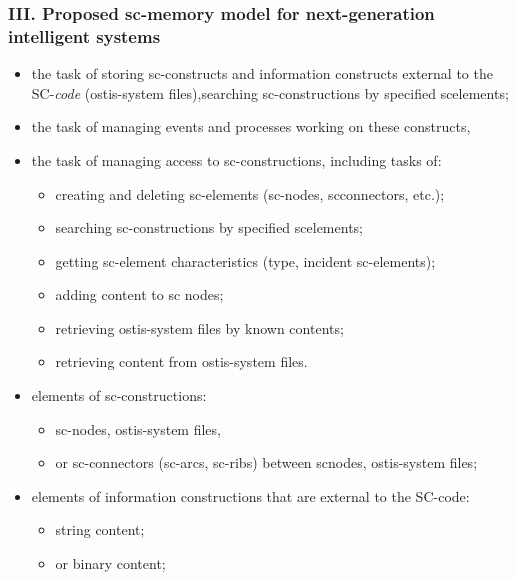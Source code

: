 \documentclass{article}
\begin{document}
\begin{multicols}{2}
\begin{center}
  \subsubsection*{\textmd{\normalsize{III. Proposed sc-memory model for next-generation
intelligent systems}}}
\end{center}

\begin{itemize}
\item the task of storing sc-constructs and information
constructs external to the SC-\textit{code} (ostis-system
files),searching sc-constructions by specified scelements;
\item the task of managing events and processes working
on these constructs,
\item the task of managing access to sc-constructions,
including tasks of:
\begin{itemize}
\item creating and deleting sc-elements (sc-nodes, scconnectors, etc.);
\item searching sc-constructions by specified scelements;
\item getting sc-element characteristics (type, incident
sc-elements);
\item adding content to sc nodes;
\item retrieving ostis-system files by known contents;
\item retrieving content from ostis-system files.
\end{itemize}
\end{itemize}
\begin{itemize}
\item elements of sc-constructions:
\begin{itemize}
\item sc-nodes, ostis-system files,
\item or sc-connectors (sc-arcs, sc-ribs) between scnodes, ostis-system files;
\end{itemize}
\end{itemize}
\begin{itemize}
\item elements of information constructions that are external to the SC-code:
\begin{itemize}
\item string content;
\item or binary content;
\end{itemize}

\end{itemize}
\end{multicols}
\end{document}
